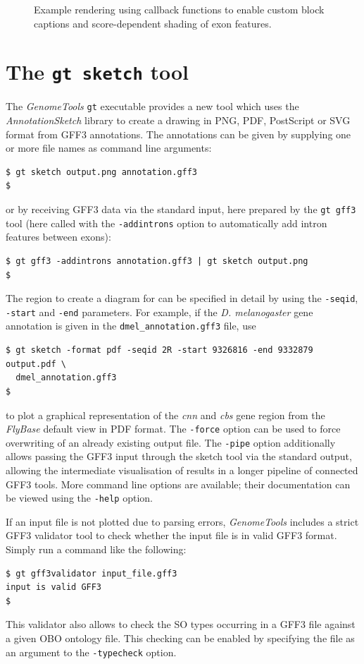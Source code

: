 \documentclass[a4paper]{scrreprt}
\begin{document}
\begin{figure}
\caption{Example rendering using callback functions to enable custom block captions and score-dependent shading of exon features.}
\label{callbacks}
\end{figure}

\section{The \texttt{gt sketch} tool}

The \emph{GenomeTools} \texttt{gt} executable provides a new tool which uses the \emph{AnnotationSketch} library to create a drawing in PNG, PDF, PostScript or SVG format from GFF3 annotations. The annotations can be given by supplying one or more file names as command line arguments:
\small
\medskip
\begin{verbatim}
$ gt sketch output.png annotation.gff3
$
\end{verbatim}
\normalsize
\medskip
or by receiving GFF3 data via the standard input, here prepared by the \texttt{gt gff3} tool (here called with the \texttt{-addintrons} option to automatically add intron features between exons):
\small
\medskip
\begin{verbatim}
$ gt gff3 -addintrons annotation.gff3 | gt sketch output.png
$
\end{verbatim}
\normalsize
\medskip
The region to create a diagram for can be specified in detail by using the \texttt{-seqid}, \texttt{-start} and \texttt{-end} parameters. For example, if the \emph{D. melanogaster} gene annotation is given in the \texttt{dmel\_annotation.gff3} file, use
\small
\medskip
\begin{verbatim}
$ gt sketch -format pdf -seqid 2R -start 9326816 -end 9332879 output.pdf \
  dmel_annotation.gff3
$
\end{verbatim}
\normalsize
\medskip
to plot a graphical representation of the \emph{cnn} and \emph{cbs} gene region from the \emph{FlyBase} default view in PDF format.
The \texttt{-force} option can be used to force overwriting of an already existing output file. The \texttt{-pipe} option additionally allows passing the GFF3 input through the sketch tool via the standard output, allowing the intermediate visualisation of results in a longer pipeline of connected GFF3 tools. More command line options are available; their documentation can be viewed using the \texttt{-help} option.

If an input file is not plotted due to parsing errors, \emph{GenomeTools} includes a strict GFF3 validator tool to check whether the input file is in valid GFF3 format. Simply run a command like the following:
\small
\medskip
\begin{verbatim}
$ gt gff3validator input_file.gff3
input is valid GFF3
$
\end{verbatim}
\normalsize
\medskip
This validator also allows to check the SO types occurring in a GFF3 file against a given OBO ontology file. This checking can be enabled by specifying the file as an argument to the \texttt{-typecheck} option.
\end{document}
